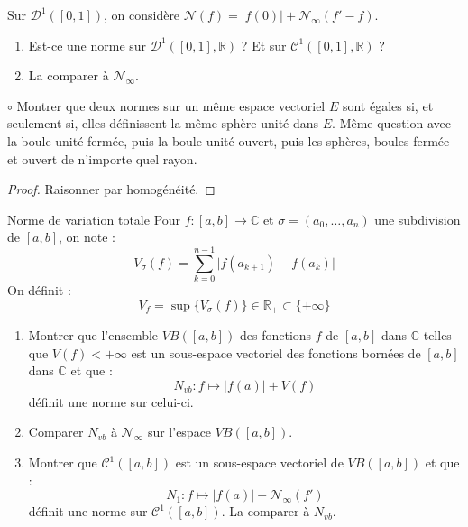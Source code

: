 \documentclass[french,a4paper]{article}
\newcommand{\R}{\mathbb{R}}
\newcommand{\C}{\mathbb{C}}
\theoremstyle{plain}
\theoremstyle{definition}
\theoremstyle{remark}
\begin{document}
\begin{ex}{}
	Sur $\mathcal{D}^1([0,1])$, on considère $\mathcal{N}(f)=\lvert f(0)\rvert+\mathcal{N}_\infty(f'-f)$.
	\begin{enumerate}
		\item Est-ce une norme sur $\mathcal{D}^1([0,1],\R)$ ? Et sur $\mathcal{C}^1([0,1],\R)$ ?
		\item La comparer à $\mathcal{N}_\infty$.
	\end{enumerate}
\end{ex}

\begin{ex}{$\circ$}
	Montrer que deux normes sur un même espace vectoriel $E$ sont égales si, et seulement si, elles définissent la même sphère unité dans $E$. Même question avec la boule unité fermée, puis la boule unité ouvert, puis les sphères, boules fermée et ouvert de n'importe quel rayon.
\end{ex}
\begin{proof}
	Raisonner par homogénéité.
\end{proof}

\begin{ex}{Norme de variation totale}
	Pour $f:[a,b]\to\C$ et $\sigma=(a_0,\ldots,a_n)$ une subdivision de $[a,b]$, on note : $$V_\sigma(f)=\sum_{k=0}^{n-1}\lvert f(a_{k+1})-f(a_k)\rvert$$ On définit : $$V_f=\sup\{V_\sigma(f)\}\in\R_+\subset\{+\infty\}$$
	\begin{enumerate}
		\item Montrer que l'ensemble $VB([a,b])$ des fonctions $f$ de $[a,b]$ dans $\C$ telles que $V(f)<+\infty$ est un sous-espace vectoriel des fonctions bornées de $[a,b]$ dans $\C$ et que : $$N_{vb}:f\mapsto\lvert f(a)\rvert+V(f)$$ définit une norme sur celui-ci.
		\item Comparer $N_{vb}$ à $\mathcal{N}_\infty$ sur l'espace $VB([a,b])$.
		\item Montrer que $\mathcal{C}^1([a,b])$ est un sous-espace vectoriel de $VB([a,b])$ et que : $$N_1:f\mapsto\lvert f(a)\rvert+\mathcal{N}_\infty(f')$$ définit une norme sur $\mathcal{C}^1([a,b])$. La comparer à $N_{vb}$.
	\end{enumerate}
\end{ex}
\end{document}
